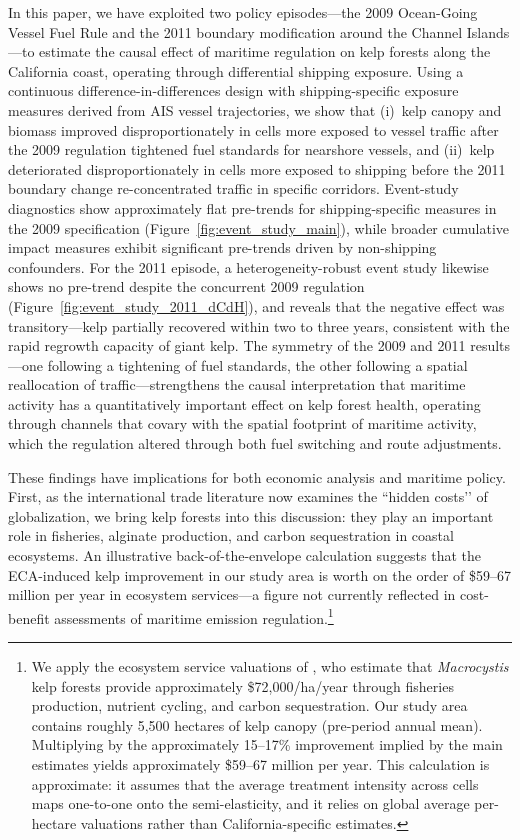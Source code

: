 \documentclass[12pt]{article}
\begin{document}
In this paper, we have exploited two policy episodes---the 2009 Ocean-Going Vessel Fuel Rule and the 2011 boundary modification around the Channel Islands---to estimate the causal effect of maritime regulation on kelp forests along the California coast, operating through differential shipping exposure. Using a continuous difference-in-differences design with shipping-specific exposure measures derived from AIS vessel trajectories, we show that (i)~kelp canopy and biomass improved disproportionately in cells more exposed to vessel traffic after the 2009 regulation tightened fuel standards for nearshore vessels, and (ii)~kelp deteriorated disproportionately in cells more exposed to shipping before the 2011 boundary change re-concentrated traffic in specific corridors. Event-study diagnostics show approximately flat pre-trends for shipping-specific measures in the 2009 specification (Figure~\ref{fig:event_study_main}), while broader cumulative impact measures exhibit significant pre-trends driven by non-shipping confounders. For the 2011 episode, a heterogeneity-robust event study \citep{Chaisemartin2024} likewise shows no pre-trend despite the concurrent 2009 regulation (Figure~\ref{fig:event_study_2011_dCdH}), and reveals that the negative effect was transitory---kelp partially recovered within two to three years, consistent with the rapid regrowth capacity of giant kelp. The symmetry of the 2009 and 2011 results---one following a tightening of fuel standards, the other following a spatial reallocation of traffic---strengthens the causal interpretation that maritime activity has a quantitatively important effect on kelp forest health, operating through channels that covary with the spatial footprint of maritime activity, which the regulation altered through both fuel switching and route adjustments.

These findings have implications for both economic analysis and maritime policy. First, as the international trade literature now examines the ``hidden costs’’ of globalization, we bring kelp forests into this discussion: they play an important role in fisheries, alginate production, and carbon sequestration in coastal ecosystems. An illustrative back-of-the-envelope calculation suggests that the ECA-induced kelp improvement in our study area is worth on the order of \$59--67 million per year in ecosystem services---a figure not currently reflected in cost-benefit assessments of maritime emission regulation.\footnote{We apply the ecosystem service valuations of \citet{Eger2023}, who estimate that \textit{Macrocystis} kelp forests provide approximately \$72,000/ha/year through fisheries production, nutrient cycling, and carbon sequestration. Our study area contains roughly 5,500 hectares of kelp canopy (pre-period annual mean). Multiplying by the approximately 15--17\% improvement implied by the main estimates yields approximately \$59--67 million per year. This calculation is approximate: it assumes that the average treatment intensity across cells maps one-to-one onto the semi-elasticity, and it relies on global average per-hectare valuations rather than California-specific estimates.}
\end{document}
